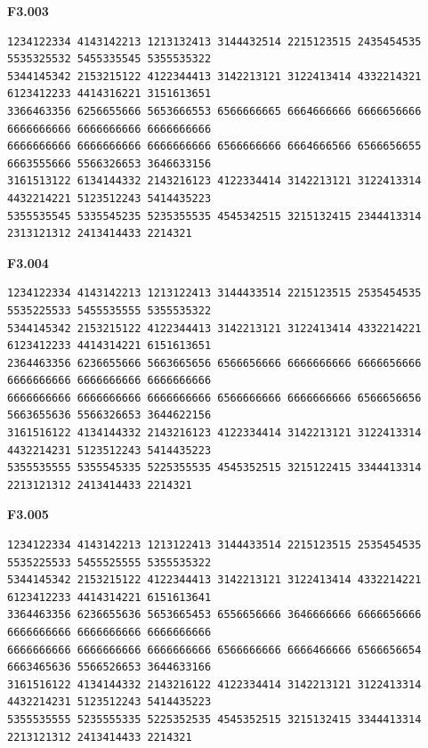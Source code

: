 \noindent\begin{minipage}{\linewidth}\textbf{F3.003}
\begin{lstlisting}
1234122334 4143142213 1213132413 3144432514 2215123515 2435454535 5535325532 5455335545 5355535322
5344145342 2153215122 4122344413 3142213121 3122413414 4332214321 6123412233 4414316221 3151613651
3366463356 6256655666 5653666553 6566666665 6664666666 6666656666 6666666666 6666666666 6666666666
6666666666 6666666666 6666666666 6566666666 6664666566 6566656655 6663555666 5566326653 3646633156
3161513122 6134144332 2143216123 4122334414 3142213121 3122413314 4432214221 5123512243 5414435223
5355535545 5335545235 5235355535 4545342515 3215132415 2344413314 2313121312 2413414433 2214321
\end{lstlisting}
\end{minipage}\par\smallskip

\noindent\begin{minipage}{\linewidth}\textbf{F3.004}
\begin{lstlisting}
1234122334 4143142213 1213122413 3144433514 2215123515 2535454535 5535225533 5455535555 5355535322
5344145342 2153215122 4122344413 3142213121 3122413414 4332214221 6123412233 4414314221 6151613651
2364463356 6236655666 5663665656 6566656666 6666666666 6666656666 6666666666 6666666666 6666666666
6666666666 6666666666 6666666666 6566666666 6666666666 6566656656 5663655636 5566326653 3644622156
3161516122 4134144332 2143216123 4122334414 3142213121 3122413314 4432214231 5123512243 5414435223
5355535555 5355545335 5225355535 4545352515 3215122415 3344413314 2213121312 2413414433 2214321
\end{lstlisting}
\end{minipage}\par\smallskip

\noindent\begin{minipage}{\linewidth}\textbf{F3.005}
\begin{lstlisting}
1234122334 4143142213 1213122413 3144433514 2215123515 2535454535 5535225533 5455525555 5355535322
5344145342 2153215122 4122344413 3142213121 3122413414 4332214221 6123412233 4414314221 6151613641
3364463356 6236655636 5653665453 6556656666 3646666666 6666656666 6666666666 6666666666 6666666666
6666666666 6666666666 6666666666 6566666666 6666466666 6566656654 6663465636 5566526653 3644633166
3161516122 4134144332 2143216122 4122334414 3142213121 3122413314 4432214231 5123512243 5414435223
5355535555 5235555335 5225352535 4545352515 3215132415 3344413314 2213121312 2413414433 2214321
\end{lstlisting}
\end{minipage}\par\smallskip

